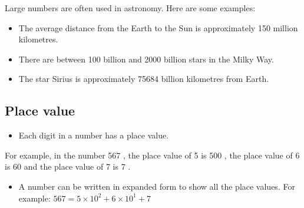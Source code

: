 Large numbers are often used in astronomy. Here are some examples:

\begin{itemize}
  \item The average distance from the Earth to the Sun is approximately 150 million kilometres.
  \item There are between 100 billion and 2000 billion stars in the Milky Way.
  \item The star Sirius is approximately 75684 billion kilometres from Earth.
\end{itemize}

\subsection{Place value}
\begin{itemize}
  \item Each digit in a number has a place value.
\end{itemize}

For example, in the number 567 , the place value of 5 is 500 , the place value of 6 is 60 and the place value of 7 is 7 .

\begin{itemize}
  \item A number can be written in expanded form to show all the place values. For example: \(567=5 \times 10^{2}+6 \times 10^{1}+7\)
\end{itemize}

